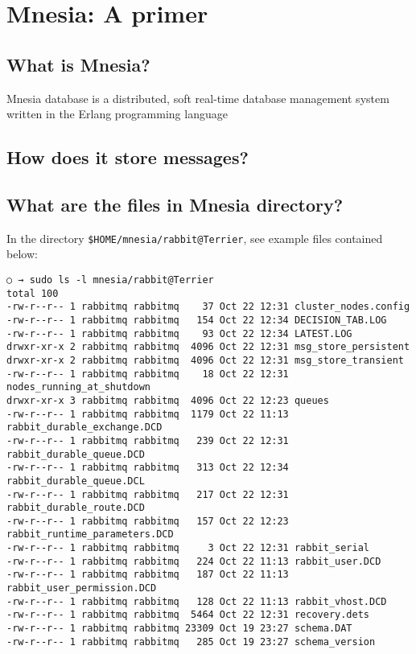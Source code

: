 \section{Mnesia: A primer}
	\subsection{What is Mnesia?}
Mnesia database is a distributed, soft real-time database management system written in the Erlang programming language

	\subsection{How does it store messages?}



	\subsection{What are the files in Mnesia directory?}
	In the directory \verb+$HOME/mnesia/rabbit@Terrier+, see example files contained below:
	\begin{verbatim}
○ → sudo ls -l mnesia/rabbit@Terrier
total 100
-rw-r--r-- 1 rabbitmq rabbitmq    37 Oct 22 12:31 cluster_nodes.config
-rw-r--r-- 1 rabbitmq rabbitmq   154 Oct 22 12:34 DECISION_TAB.LOG
-rw-r--r-- 1 rabbitmq rabbitmq    93 Oct 22 12:34 LATEST.LOG
drwxr-xr-x 2 rabbitmq rabbitmq  4096 Oct 22 12:31 msg_store_persistent
drwxr-xr-x 2 rabbitmq rabbitmq  4096 Oct 22 12:31 msg_store_transient
-rw-r--r-- 1 rabbitmq rabbitmq    18 Oct 22 12:31 nodes_running_at_shutdown
drwxr-xr-x 3 rabbitmq rabbitmq  4096 Oct 22 12:23 queues
-rw-r--r-- 1 rabbitmq rabbitmq  1179 Oct 22 11:13 rabbit_durable_exchange.DCD
-rw-r--r-- 1 rabbitmq rabbitmq   239 Oct 22 12:31 rabbit_durable_queue.DCD
-rw-r--r-- 1 rabbitmq rabbitmq   313 Oct 22 12:34 rabbit_durable_queue.DCL
-rw-r--r-- 1 rabbitmq rabbitmq   217 Oct 22 12:31 rabbit_durable_route.DCD
-rw-r--r-- 1 rabbitmq rabbitmq   157 Oct 22 12:23 rabbit_runtime_parameters.DCD
-rw-r--r-- 1 rabbitmq rabbitmq     3 Oct 22 12:31 rabbit_serial
-rw-r--r-- 1 rabbitmq rabbitmq   224 Oct 22 11:13 rabbit_user.DCD
-rw-r--r-- 1 rabbitmq rabbitmq   187 Oct 22 11:13 rabbit_user_permission.DCD
-rw-r--r-- 1 rabbitmq rabbitmq   128 Oct 22 11:13 rabbit_vhost.DCD
-rw-r--r-- 1 rabbitmq rabbitmq  5464 Oct 22 12:31 recovery.dets
-rw-r--r-- 1 rabbitmq rabbitmq 23309 Oct 19 23:27 schema.DAT
-rw-r--r-- 1 rabbitmq rabbitmq   285 Oct 19 23:27 schema_version
\end{verbatim}

